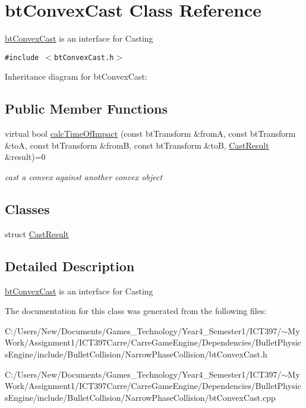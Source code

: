 \hypertarget{classbt_convex_cast}{
\section{btConvexCast Class Reference}
\label{classbt_convex_cast}
}
\hyperlink{classbt_convex_cast}{btConvexCast} is an interface for Casting  


{\tt \#include $<$btConvexCast.h$>$}

Inheritance diagram for btConvexCast:\subsection*{Public Member Functions}
\begin{CompactItemize}
\item 
\hypertarget{classbt_convex_cast_baf0f25a8cccfcafdaabada83c8d2bfb}{
virtual bool \hyperlink{classbt_convex_cast_baf0f25a8cccfcafdaabada83c8d2bfb}{calcTimeOfImpact} (const btTransform \&fromA, const btTransform \&toA, const btTransform \&fromB, const btTransform \&toB, \hyperlink{structbt_convex_cast_1_1_cast_result}{CastResult} \&result)=0}
\label{classbt_convex_cast_baf0f25a8cccfcafdaabada83c8d2bfb}

\begin{CompactList}\small\item\em cast a convex against another convex object \item\end{CompactList}\end{CompactItemize}
\subsection*{Classes}
\begin{CompactItemize}
\item 
struct \hyperlink{structbt_convex_cast_1_1_cast_result}{CastResult}
\end{CompactItemize}


\subsection{Detailed Description}
\hyperlink{classbt_convex_cast}{btConvexCast} is an interface for Casting 

The documentation for this class was generated from the following files:\begin{CompactItemize}
\item 
C:/Users/New/Documents/Games\_\-Technology/Year4\_\-Semester1/ICT397/$\sim$My Work/Assignment1/ICT397Carre/CarreGameEngine/Dependencies/BulletPhysicsEngine/include/BulletCollision/NarrowPhaseCollision/btConvexCast.h\item 
C:/Users/New/Documents/Games\_\-Technology/Year4\_\-Semester1/ICT397/$\sim$My Work/Assignment1/ICT397Carre/CarreGameEngine/Dependencies/BulletPhysicsEngine/include/BulletCollision/NarrowPhaseCollision/btConvexCast.cpp\end{CompactItemize}
